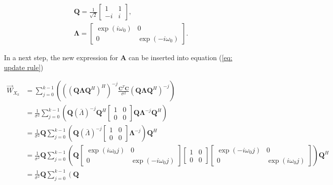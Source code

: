 \documentclass[11pt,a4paper,twoside]{report}
\newcommand{\messF}[3]{\vec{#1}_{{#2}_{k{#3}}}}
\newcommand{\mat}[1]{\mathbf{#1}}
\begin{document}
\begin{align*}
	&\mat{Q} = \frac{1}{\sqrt{2}}
		\begin{bmatrix}
			1 & 1 \\
			-i & i
		\end{bmatrix},
	\\
	&\mat{\Lambda} = 
		\begin{bmatrix}
			\exp{(i\omega_0)} & 0 \\
			0 & \exp{(-i\omega_0)}
		\end{bmatrix}.
\end{align*}

In a next step, the new expression for $\mat{A}$ can be inserted into equation (\ref{eq: update rule}) \cite{ST:Malmberg}

\begin{align}
	\nonumber
	\messF{W}{X}{} &= \sum_{j=0}^{k-1}\left(\left(\left(\mat{Q\Lambda}\mat{Q}^H\right)^H\right)^{-j}\frac{\mat{C}^T\mat{C}}{\sigma^2}\left(\mat{Q\Lambda}\mat{Q}^H\right)^{-j}\right) \\
	\label{eq: update rule, unitary Q}
	&= \frac{1}{\sigma^2}\sum_{j=0}^{k-1}\left(\mat{Q}\left(\bar{\Lambda}\right)^{-j}\mat{Q}^H
		\begin{bmatrix}
			1 & 0 \\
			0 & 0
		\end{bmatrix}
		\mat{Q}\mat{\Lambda}^{-j}\mat{Q}^H\right)
	\\
	\nonumber
	&= \frac{1}{\sigma^2}\mat{Q}\sum_{j=0}^{k-1}\left(\mat{Q}\left(\bar{\Lambda}\right)^{-j}
		\begin{bmatrix}
			1 & 0 \\
			0 & 0
		\end{bmatrix}
		\mat{\Lambda}^{-j}\right)\mat{Q}^H
	\\
	\nonumber
	&= \frac{1}{\sigma^2}\mat{Q}\sum_{j=0}^{k-1}\left(\mat{Q}
		\begin{bmatrix}
			\exp{(i\omega_0j)} & 0 \\
			0 & \exp{(-i\omega_0j)}
		\end{bmatrix}
		\begin{bmatrix}
			1 & 0 \\
			0 & 0
		\end{bmatrix}
		\begin{bmatrix}
			\exp{(-i\omega_0j)} & 0 \\
			0 & \exp{(i\omega_0j)}
		\end{bmatrix}
		\right)\mat{Q}^H
	\\
	\nonumber
	&= \frac{1}{\sigma^2}\mat{Q}\sum_{j=0}^{k-1}\left(\mat{Q}

\end{align}
\end{document}
